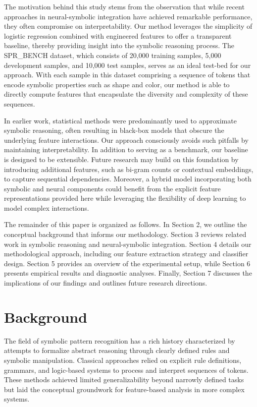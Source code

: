 \documentclass{article}
\begin{document}
The motivation behind this study stems from the observation that while recent approaches in neural-symbolic integration have achieved remarkable performance, they often compromise on interpretability. Our method leverages the simplicity of logistic regression combined with engineered features to offer a transparent baseline, thereby providing insight into the symbolic reasoning process. The SPR\_BENCH dataset, which consists of 20,000 training samples, 5,000 development samples, and 10,000 test samples, serves as an ideal test-bed for our approach. With each sample in this dataset comprising a sequence of tokens that encode symbolic properties such as shape and color, our method is able to directly compute features that encapsulate the diversity and complexity of these sequences.

In earlier work, statistical methods were predominantly used to approximate symbolic reasoning, often resulting in black-box models that obscure the underlying feature interactions. Our approach consciously avoids such pitfalls by maintaining interpretability. In addition to serving as a benchmark, our baseline is designed to be extensible. Future research may build on this foundation by introducing additional features, such as bi-gram counts or contextual embeddings, to capture sequential dependencies. Moreover, a hybrid model incorporating both symbolic and neural components could benefit from the explicit feature representations provided here while leveraging the flexibility of deep learning to model complex interactions. 

The remainder of this paper is organized as follows. In Section 2, we outline the conceptual background that informs our methodology. Section 3 reviews related work in symbolic reasoning and neural-symbolic integration. Section 4 details our methodological approach, including our feature extraction strategy and classifier design. Section 5 provides an overview of the experimental setup, while Section 6 presents empirical results and diagnostic analyses. Finally, Section 7 discusses the implications of our findings and outlines future research directions.

\section{Background}
The field of symbolic pattern recognition has a rich history characterized by attempts to formalize abstract reasoning through clearly defined rules and symbolic manipulation. Classical approaches relied on explicit rule definitions, grammars, and logic-based systems to process and interpret sequences of tokens. These methods achieved limited generalizability beyond narrowly defined tasks but laid the conceptual groundwork for feature-based analysis in more complex systems.
\end{document}
